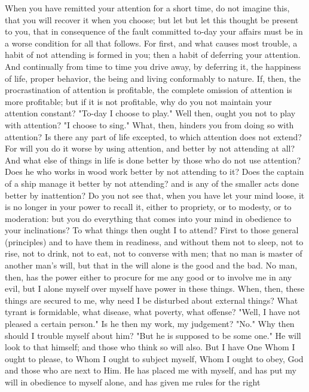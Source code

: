 \documentclass[a4paper]{article}
\begin{document}
    When you have remitted your attention for a short time, do not imagine
this, that you will recover it when you choose; but let but let this thought be
present to you, that in consequence of the fault committed to-day your affairs
must be in a worse condition for all that follows. For first, and what causes
most trouble, a habit of not attending is formed in you; then a habit of
deferring your attention. And continually from time to time you drive away, by
deferring it, the happiness of life, proper behavior, the being and living
conformably to nature. If, then, the procrastination of attention is
profitable, the complete omission of attention is more profitable; but if it is
not profitable, why do you not maintain your attention constant? "To-day I
choose to play." Well then, ought you not to play with attention? "I choose to
sing." What, then, hinders you from doing so with attention? Is there any part
of life excepted, to which attention does not extend? For will you do it worse
by using attention, and better by not attending at all? And what else of things
in life is done better by those who do not use attention? Does he who works in
wood work better by not attending to it? Does the captain of a ship manage it
better by not attending? and is any of the smaller acts done better by
inattention? Do you not see that, when you have let your mind loose, it is no
longer in your power to recall it, either to propriety, or to modesty, or to
moderation: but you do everything that comes into your mind in obedience to
your inclinations?
    To what things then ought I to attend? First to those general (principles)
and to have them in readiness, and without them not to sleep, not to rise, not
to drink, not to eat, not to converse with men; that no man is master of
another man's will, but that in the will alone is the good and the bad. No man,
then, has the power either to procure for me any good or to involve me in any
evil, but I alone myself over myself have power in these things. When, then,
these things are secured to me, why need I be disturbed about external things?
What tyrant is formidable, what disease, what poverty, what offense? "Well, I
have not pleased a certain person." Is he then my work, my judgement? "No." Why
then should I trouble myself about him? "But he is supposed to be some one." He
will look to that himself; and those who think so will also. But I have One
Whom I ought to please, to Whom I ought to subject myself, Whom I ought to
obey, God and those who are next to Him. He has placed me with myself, and has
put my will in obedience to myself alone, and has given me rules for the right
\end{document}
